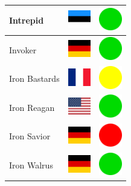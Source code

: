\documentclass[12pt, a4paper, twoside]{report}
\begin{document}
\begin{center}
\begin{longtable}{|p{5cm}|p{2cm}|p{2cm}|}
 Intrepid                                                   & \includegraphics[width=1cm]{../4x3/ee} &   \includegraphics[width=1cm]{../likes/y} \\ \hline
 Invoker                                                    & \includegraphics[width=1cm]{../4x3/de} &   \includegraphics[width=1cm]{../likes/y} \\ \hline
 Iron Bastards                                              & \includegraphics[width=1cm]{../4x3/fr} &   \includegraphics[width=1cm]{../likes/m} \\ \hline
 Iron Reagan                                                & \includegraphics[width=1cm]{../4x3/us} &   \includegraphics[width=1cm]{../likes/y} \\ \hline
 Iron Savior                                                & \includegraphics[width=1cm]{../4x3/de} &   \includegraphics[width=1cm]{../likes/n} \\ \hline
 Iron Walrus                                                & \includegraphics[width=1cm]{../4x3/de} &   \includegraphics[width=1cm]{../likes/y} \\ \hline

\end{longtable}
\end{center}
\end{document}
